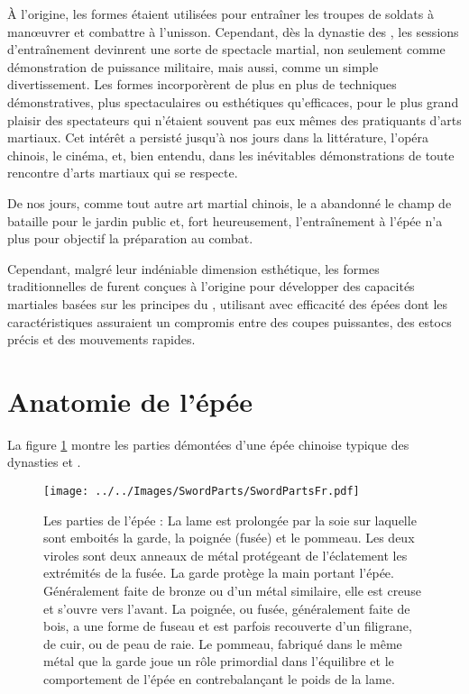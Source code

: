 \`{A} l'origine, les formes étaient utilisées pour entraîner les troupes de soldats à manœuvrer et combattre à l'unisson. Cependant, dès la dynastie des \Tang{}, les sessions d'entraînement devinrent une sorte de spectacle martial, non seulement comme démonstration de puissance militaire, mais aussi, comme un simple divertissement.
Les formes incorporèrent de plus en plus de techniques démonstratives, plus spectaculaires ou esthétiques qu'efficaces, pour le plus grand plaisir des spectateurs qui n'étaient souvent pas eux mêmes des pratiquants d'arts martiaux. 
Cet intérêt a persisté jusqu'à nos jours dans la littérature, l'opéra chinois, le cinéma, et, bien entendu, dans les inévitables démonstrations de toute rencontre d'arts martiaux qui se respecte.

De nos jours, comme tout autre art martial chinois, le \Taijijian{} a abandonné le champ de bataille pour le jardin public et, fort heureusement, l'entraînement à l'épée n'a plus pour objectif la préparation au combat.

Cependant, malgré leur indéniable dimension esthétique, les formes traditionnelles de \Taijijian{} furent conçues à l'origine pour développer des capacités martiales basées sur les principes du \Taiji{}, utilisant avec efficacité des épées dont les caractéristiques assuraient un compromis entre des coupes puissantes, des estocs précis et des mouvements rapides.

\section{Anatomie de l'épée \Jian{}}
La figure \ref{fig:sword_parts} montre les parties démontées d'une épée chinoise \Jian{} typique des dynasties \Ming{} et \Qing{}.

\begin{figure}[ht]
\centering
	\texttt{[image: ../../Images/SwordParts/SwordPartsFr.pdf]}
	\caption[Parties de l'épée]{Les parties de l'épée : La lame est prolongée par la soie sur laquelle sont emboités la garde, la poignée (fusée) et le pommeau. Les deux viroles sont deux anneaux de métal protégeant de l'éclatement les extrémités de la fusée. La garde protège la main portant l'épée. Généralement faite de bronze ou d'un métal similaire, elle est creuse et s'ouvre vers l'avant. La poignée, ou fusée, généralement faite de bois, a une forme de fuseau et est parfois recouverte d'un filigrane, de cuir, ou de peau de raie.
	Le pommeau, fabriqué dans le même métal que la garde joue un rôle primordial dans l'équilibre et le comportement de l'épée en contrebalançant le poids de la lame.}
	\label{fig:sword_parts}
\end{figure}

